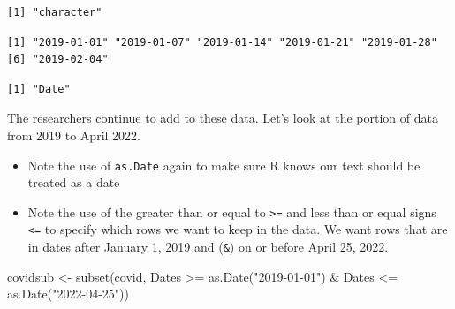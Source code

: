 \documentclass[
  letterpaper,
  DIV=11,
  numbers=noendperiod]{scrreprt}
\newenvironment{Shaded}{\begin{snugshade}}{\end{snugshade}}
\newcommand{\DocumentationTok}[1]{\textcolor[rgb]{0.37,0.37,0.37}{\textit{#1}}}
\newcommand{\FunctionTok}[1]{\textcolor[rgb]{0.28,0.35,0.67}{#1}}
\newcommand{\NormalTok}[1]{\textcolor[rgb]{0.00,0.23,0.31}{#1}}
\newcommand{\OtherTok}[1]{\textcolor[rgb]{0.00,0.23,0.31}{#1}}
\newcommand{\SpecialCharTok}[1]{\textcolor[rgb]{0.37,0.37,0.37}{#1}}
\newcommand{\StringTok}[1]{\textcolor[rgb]{0.13,0.47,0.30}{#1}}
\providecommand{\tightlist}{%
  \setlength{\itemsep}{0pt}\setlength{\parskip}{0pt}}\usepackage{longtable,booktabs,array}
\begin{document}
\begin{Shaded}
\end{Shaded}

\begin{verbatim}
[1] "character"
\end{verbatim}

\begin{Shaded}
\end{Shaded}

\begin{verbatim}
[1] "2019-01-01" "2019-01-07" "2019-01-14" "2019-01-21" "2019-01-28"
[6] "2019-02-04"
\end{verbatim}

\begin{Shaded}
\end{Shaded}

\begin{verbatim}
[1] "Date"
\end{verbatim}

The researchers continue to add to these data. Let's look at the portion
of data from 2019 to April 2022.

\begin{itemize}
\tightlist
\item
  Note the use of \texttt{as.Date} again to make sure R knows our text
  should be treated as a date
\item
  Note the use of the greater than or equal to \texttt{\textgreater{}=}
  and less than or equal signs \texttt{\textless{}=} to specify which
  rows we want to keep in the data. We want rows that are in dates after
  January 1, 2019 and (\texttt{\&}) on or before April 25, 2022.
\end{itemize}

\begin{Shaded}
\begin{Highlighting}[]
\NormalTok{covidsub }\OtherTok{\textless{}{-}} \FunctionTok{subset}\NormalTok{(covid, Dates }\SpecialCharTok{\textgreater{}=} \FunctionTok{as.Date}\NormalTok{(}\StringTok{"2019{-}01{-}01"}\NormalTok{) }\SpecialCharTok{\&}
\NormalTok{                     Dates }\SpecialCharTok{\textless{}=} \FunctionTok{as.Date}\NormalTok{(}\StringTok{"2022{-}04{-}25"}\NormalTok{))}
\end{Highlighting}
\end{Shaded}
\end{document}

